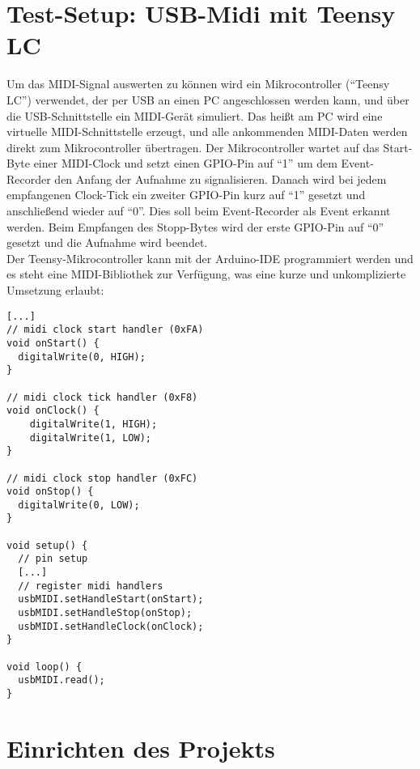 \section{Test-Setup: USB-Midi mit Teensy LC}
  
Um das MIDI-Signal auswerten zu können wird ein Mikrocontroller (``Teensy LC'') verwendet, der per USB an einen PC angeschlossen werden kann, und über die USB-Schnittstelle ein MIDI-Gerät simuliert.  Das heißt am PC wird eine virtuelle MIDI-Schnittstelle erzeugt, und alle ankommenden MIDI-Daten werden direkt zum Mikrocontroller übertragen. Der Mikrocontroller wartet auf das Start-Byte einer MIDI-Clock und setzt einen GPIO-Pin auf ``1'' um dem Event-Recorder den Anfang der Aufnahme zu signalisieren. 
Danach wird bei jedem empfangenen Clock-Tick ein zweiter GPIO-Pin kurz auf ``1'' gesetzt und anschließend wieder auf ``0''. Dies soll beim Event-Recorder als Event erkannt werden. Beim Empfangen des Stopp-Bytes wird der erste GPIO-Pin auf ``0'' gesetzt und die Aufnahme wird beendet.\\
Der Teensy-Mikrocontroller kann mit der Arduino-IDE programmiert werden und es steht eine MIDI-Bibliothek zur Verfügung, was eine kurze und unkomplizierte Umsetzung erlaubt:
\begin{verbatim}
[...]
// midi clock start handler (0xFA)
void onStart() {
  digitalWrite(0, HIGH);
}

// midi clock tick handler (0xF8) 
void onClock() {
    digitalWrite(1, HIGH);
    digitalWrite(1, LOW);
}

// midi clock stop handler (0xFC)
void onStop() {
  digitalWrite(0, LOW);
}

void setup() {
  // pin setup
  [...]
  // register midi handlers
  usbMIDI.setHandleStart(onStart);
  usbMIDI.setHandleStop(onStop);
  usbMIDI.setHandleClock(onClock);
}

void loop() {
  usbMIDI.read();
}
\end{verbatim}

\section{Einrichten des Projekts}
\label{ch:Anwendungsfall:sec:Einrichten}

